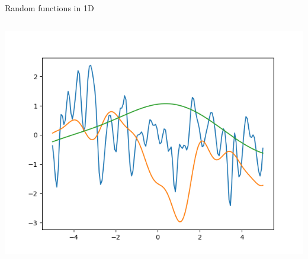 \documentclass[presentation]{beamer}
\begin{document}
\begin{frame}[fragile,label={sec:orgc07a768}]{Random functions in 1D}
\begin{columns}
\begin{column}{0.4\columnwidth}
\begin{center}
\includegraphics[width=.9\linewidth]{images/fig08.png}
\end{center}
\end{column}
\end{columns}
\end{frame}
\end{document}
